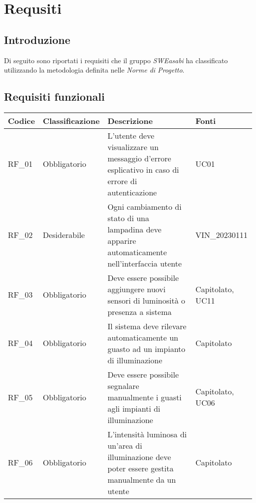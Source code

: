 \chapter{Requsiti}

\section{Introduzione}
Di seguito sono riportati i requisiti che il gruppo \textit{SWEasabi} ha classificato utilizzando la metodologia definita nelle \textit{Norme di Progetto}.

\section{Requisiti funzionali}

\begin{center}
    \begin{xltabular}{\linewidth}{|l|l|X|l|}
        \hline
        \textbf{Codice} & \textbf{Classificazione} & \textbf{Descrizione} & \textbf{Fonti} \\
        \hline
        RF\_01 & Obbligatorio & L'utente deve visualizzare un messaggio d'errore esplicativo in caso di errore di autenticazione & UC01 \\

        \hline
        RF\_02 & Desiderabile &Ogni cambiamento di stato di una lampadina deve apparire automaticamente nell'interfaccia utente & VIN\_20230111\\

        \hline
        RF\_03 & Obbligatorio & Deve essere possibile aggiungere nuovi sensori di luminosità o presenza a sistema & Capitolato, UC11 \\

        \hline
        RF\_04 & Obbligatorio & Il sistema deve rilevare automaticamente un guasto ad un impianto di illuminazione & Capitolato\\
        
        \hline
        RF\_05 & Obbligatorio & Deve essere possibile segnalare manualmente i guasti agli impianti di illuminazione & Capitolato, UC06 \\

        \hline
        RF\_06 & Obbligatorio & L'intensità luminosa di un'area di illuminazione deve poter essere gestita manualmente da un utente & Capitolato\\


\end{xltabular}
\end{center}
